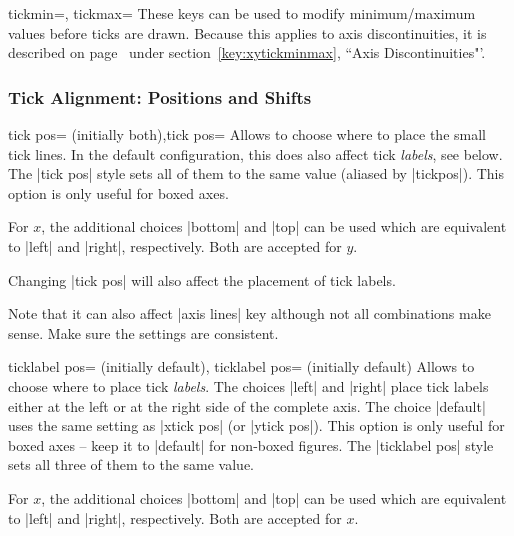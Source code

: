 \begin{pgfplotsxykeylist}{\x tickmin=, \x tickmax=}
	These keys can be used to modify minimum/maximum values before ticks are drawn. Because this applies to axis discontinuities, it is described on page~\pageref{key:xytickminmax} under section~\ref{key:xytickminmax}, ``Axis Discontinuities"'.
\end{pgfplotsxykeylist}

\subsubsection{Tick Alignment: Positions and Shifts}

\begin{pgfplotsxykeylist}{\x tick pos= (initially both),tick pos=}
Allows to choose where to place the small tick lines. In the default configuration, this does also affect tick \emph{labels}, see below. The |tick pos| style sets all of them to the same value (aliased by |tickpos|). This option is only useful for boxed axes.

For $x$, the additional choices |bottom| and |top| can be used which are equivalent to |left| and |right|, respectively. Both are accepted for $y$.

Changing |tick pos| will also affect the placement of tick labels. 

Note that it can also affect |axis lines| key although not all combinations make sense. Make sure the settings are consistent.
\end{pgfplotsxykeylist}

\begin{pgfplotsxykeylist}{%
	\x ticklabel pos= (initially default),
	   ticklabel pos= (initially default)}
Allows to choose where to place tick \emph{labels}. The choices |left| and |right| place tick labels either at the left or at the right side of the complete axis. The choice |default| uses the same setting as |xtick pos| (or |ytick pos|). This option is only useful for boxed axes -- keep it to |default| for non-boxed figures. The |ticklabel pos| style sets all three of them to the same value.

For $x$, the additional choices |bottom| and |top| can be used which are equivalent to |left| and |right|, respectively. Both are accepted for $x$.
\end{pgfplotsxykeylist}

